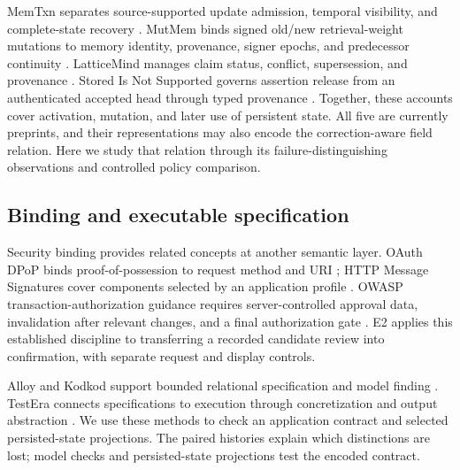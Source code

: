 MemTxn separates source-supported update admission, temporal visibility, and complete-state recovery \citep{cui2026memtxn}. MutMem binds signed old/new retrieval-weight mutations to memory identity, provenance, signer epochs, and predecessor continuity \citep{saidi2026mutmem}. LatticeMind manages claim status, conflict, supersession, and provenance \citep{zhou2026latticemind}. Stored Is Not Supported governs assertion release from an authenticated accepted head through typed provenance \citep{he2026stored}. Together, these accounts cover activation, mutation, and later use of persistent state. All five are currently preprints, and their representations may also encode the correction-aware field relation. Here we study that relation through its failure-distinguishing observations and controlled policy comparison.

\subsection{Binding and executable specification}

Security binding provides related concepts at another semantic layer. OAuth DPoP binds proof-of-possession to request method and URI \citep{fett2023dpop}; HTTP Message Signatures cover components selected by an application profile \citep{backman2024signatures}. OWASP transaction-authorization guidance requires server-controlled approval data, invalidation after relevant changes, and a final authorization gate \citep{owaspTransactionAuthorization}. E2 applies this established discipline to transferring a recorded candidate review into confirmation, with separate request and display controls.

Alloy and Kodkod support bounded relational specification and model finding \citep{jackson2002alloy,torlak2007kodkod}. TestEra connects specifications to execution through concretization and output abstraction \citep{marinov2001testera}. We use these methods to check an application contract and selected persisted-state projections. The paired histories explain which distinctions are lost; model checks and persisted-state projections test the encoded contract.

